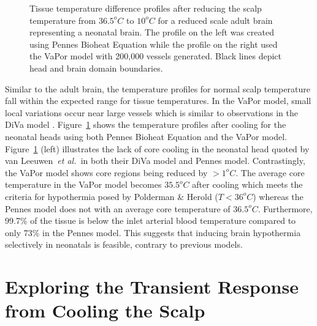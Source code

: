 \documentclass[11pt,english,a4paper,twoside,openright]{report}
\begin{document}
{{{{{{{\begin{figure}[h]
\begin{subfigure}[b]{0.49\textwidth}
	\end{subfigure}
	\caption[Tissue temperature difference profiles after reducing the scalp temperature from $36.5^{o}C$ to $10^{o}C$ for a reduced scale adult brain representing a neonatal brain]{Tissue temperature difference profiles after reducing the scalp temperature from $36.5^{o}C$ to $10^{o}C$ for a reduced scale adult brain representing a neonatal brain. The profile on the left was created using Pennes Bioheat Equation while the profile on the right used the VaPor model with 200,000 vessels generated. Black lines depict head and brain domain boundaries.}
	\label{fig:NeonatalResults}
\end{figure}

Similar to the adult brain, the temperature profiles for normal scalp temperature fall within the expected range for tissue temperatures. In the VaPor model, small local variations occur near large vessels which is similar to observations in the DiVa model \cite{van2000numerical}. Figure~\ref{fig:NeonatalResults} shows the temperature profiles after cooling for the neonatal heads using both Pennes Bioheat Equation and the VaPor model. Figure~\ref{fig:NeonatalResults} (left) illustrates the lack of core cooling in the neonatal head quoted by van Leeuwen~\textit{et al.\ }in both their DiVa model and Pennes model. Contrastingly, the VaPor model shows core regions being reduced by {$>$}$1^{o}C$. The average core temperature in the VaPor model becomes $35.5^{o}C$ after cooling which meets the criteria for hypothermia posed by Polderman \& Herold ($T{<}36^{o}C$) \cite{polderman2009therapeutic} whereas the Pennes model does not with an average core temperature of $36.5^{o}C$. Furthermore, 99.7\% of the tissue is below the inlet arterial blood temperature compared to only 73\% in the Pennes model. This suggests that inducing brain hypothermia selectively in neonatals is feasible, contrary to previous models. 

\section[Exploring the Transient Response from Cooling the Scalp]{{\Large E}xploring the {\Large T}ransient {\Large R}esponse from {\Large C}ooling the {\Large S}calp }

}}}}}}}
\end{document}

